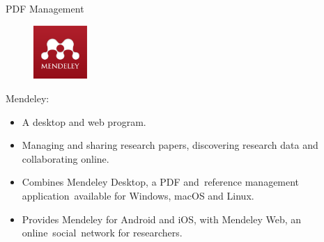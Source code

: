 \documentclass[
 size=14pt,
 paper=smartboard,  %
 mode=present, 		%
 display=slides, 	%
 style=tuliplab,  	%
 pauseslide,
 fleqn,leqno]{powerdot}{}
\begin{document}
\begin{slide}{PDF Management}

\begin{figure}
  \centering
  \includegraphics[width=0.8in]{figures/management/Mendeley_Logo.eps}\\
\end{figure}

Mendeley:

\begin{itemize}
  \item A desktop and web program.
  \item Managing and sharing research papers, discovering research data and collaborating online.
  \item Combines Mendeley Desktop, a PDF and reference management application available for Windows, macOS and Linux.
  \item Provides Mendeley for Android and iOS, with Mendeley Web, an online social network for researchers.
\end{itemize}

\end{slide}
\end{document}
